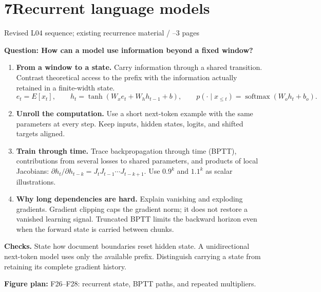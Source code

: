 \documentclass[11pt,a4paper]{article}
\newcommand{\sectionplan}[3]{%
  \section{\texorpdfstring{#1\quad #2}{#1 #2}}
  {\small\color{muted}#3\par}}
\newcommand{\tagline}[1]{\textcolor{courseblue}{\textbf{#1}}}
\newcommand{\figids}[1]{\textcolor{courseteal}{\textbf{Figure plan:} #1}}
\newcommand{\softmax}{\operatorname{softmax}}
\begin{document}
\clearpage
\sectionplan{7}{Recurrent language models}{Revised L04 sequence; existing recurrence material \quad / \quad 2--3 pages}
\tagline{Question: How can a model use information beyond a fixed window?}
\begin{enumerate}
  \item \textbf{From a window to a state.} Carry information through a
  shared transition. Contrast theoretical access to the prefix with the
  information actually retained in a finite-width state.
  \[
  e_t=E[x_t],\qquad h_t=\tanh(W_xe_t+W_hh_{t-1}+b),\qquad
  p(\cdot\mid x_{\leq t})=\softmax(W_oh_t+b_o).
  \]
  \item \textbf{Unroll the computation.} Use a short next-token example
  with the same parameters at every step. Keep inputs, hidden states,
  logits, and shifted targets aligned.
  \item \textbf{Train through time.} Trace backpropagation through time
  (BPTT), contributions from several losses to shared parameters, and
  products of local Jacobians:
  $\partial h_t/\partial h_{t-k}=J_tJ_{t-1}\cdots J_{t-k+1}$.
  Use $0.9^k$ and $1.1^k$ as scalar illustrations.
  \item \textbf{Why long dependencies are hard.} Explain vanishing and
  exploding gradients. Gradient clipping caps the gradient norm; it does
  not restore a vanished learning signal. Truncated BPTT limits the
  backward horizon even when the forward state is carried between chunks.
\end{enumerate}
\textbf{Checks.} State how document boundaries reset hidden state. A
unidirectional next-token model uses only the available prefix. Distinguish
carrying a state from retaining its complete gradient history.

\figids{F26--F28: recurrent state, BPTT paths, and repeated multipliers.}
\end{document}
